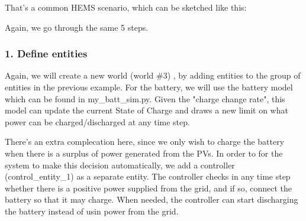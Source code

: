 \documentclass[11pt]{article}
\begin{document}
That's a common HEMS scenario, which can be sketched like this:

Again, we go through the same 5 steps.

    \subsubsection{1. Define entities}\label{define-entities}

Again, we will create a new world (world \#3) , by adding entities to
the group of entities in the previous example. For the battery, we will
use the battery model which can be found in my\_batt\_sim.py. Given the
"charge change rate", this model can update the current State of Charge
and draws a new limit on what power can be charged/discharged at any
time step.

There's an extra complecation here, since we only wish to charge the
battery when there is a surplus of power generated from the PVs. In
order to for the system to make this decision automatically, we add a
controller (control\_entity\_1) as a separate entity. The controller
checks in any time step whether there is a positive power supplied from
the grid, and if so, connect the battery so that it may charge. When
needed, the controller can start discharging the battery instead of usin
power from the grid.
\end{document}
